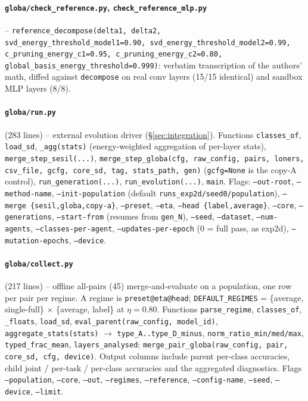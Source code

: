 \documentclass[11pt,a4paper]{article}
\newcommand{\code}[1]{\texttt{#1}}
\begin{document}
\paragraph{\code{globa/check\_reference.py}, \code{check\_reference\_mlp.py}} -- \code{reference\_decompose(delta1, delta2, svd\_energy\_threshold\_model1=0.90, svd\_energy\_threshold\_model2=0.99, c\_pruning\_energy\_c1=0.95, c\_pruning\_energy\_c2=0.80, global\_basis\_energy\_threshold=0.999)}: verbatim transcription of the authors' math, diffed against \code{decompose} on real conv layers (15/15 identical) and sandbox MLP layers (8/8).

\paragraph{\code{globa/run.py}} (283 lines) -- external evolution driver (\S\ref{sec:integration}). Functions \code{classes\_of}, \code{load\_sd}, \code{\_agg(stats)} (energy-weighted aggregation of per-layer stats), \code{merge\_step\_sesil(...)}, \code{merge\_step\_globa(cfg, raw\_config, pairs, loners, csv\_file, gcfg, core\_sd, tag, stats\_path, gen)} (\code{gcfg=None} is the copy-A control), \code{run\_generation(...)}, \code{run\_evolution(...)}, \code{main}. Flags: \code{--out-root}, \code{--method-name}, \code{--init-population} (default \code{runs\_exp2d/seed0/population}), \code{--merge \{sesil,globa,copy-a\}}, \code{--preset}, \code{--eta}, \code{--head \{label,average\}}, \code{--core}, \code{--generations}, \code{--start-from} (resumes from \code{gen\_N}), \code{--seed}, \code{--dataset}, \code{--num-agents}, \code{--classes-per-agent}, \code{--updates-per-epoch} (0 = full pass, as exp2d), \code{--mutation-epochs}, \code{--device}.

\paragraph{\code{globa/collect.py}} (217 lines) -- offline all-pairs (45) merge-and-evaluate on a population, one row per pair per regime. A regime is \code{preset@eta@head}; \code{DEFAULT\_REGIMES} = \{average, single-full\} $\times$ \{average, label\} at $\eta=0.80$. Functions \code{parse\_regime}, \code{classes\_of}, \code{\_floats}, \code{load\_sd}, \code{eval\_parent(raw\_config, model\_id)}, \code{aggregate\_stats(stats)} $\to$ \code{type\_A..type\_D\_minus}, \code{norm\_ratio\_min/med/max}, \code{typed\_frac\_mean}, \code{layers\_analysed}; \code{merge\_pair\_globa(raw\_config, pair, core\_sd, cfg, device)}. Output columns include parent per-class accuracies, child joint / per-task / per-class accuracies and the aggregated diagnostics. Flags \code{--population}, \code{--core}, \code{--out}, \code{--regimes}, \code{--reference}, \code{--config-name}, \code{--seed}, \code{--device}, \code{--limit}.
\end{document}
